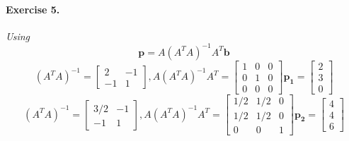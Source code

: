 \documentclass{article}
\begin{document}
\paragraph{Exercise 5.}
    \textit{
        Using
        \[
        \mathbf{p}=A(A^TA)^{-1}A^T\mathbf{b}
        \]
        \[
        (A^TA)^{-1}=\begin{bmatrix}
           2 & -1\\-1 & 1
        \end{bmatrix},
        A(A^TA)^{-1}A^T= \begin{bmatrix}
            1 & 0 & 0\\
            0 & 1 & 0 \\
            0 & 0 & 0
         \end{bmatrix}
        \mathbf{p_1}=\begin{bmatrix}
            2\\3\\0
        \end{bmatrix}
        \]
        \[
            (A^TA)^{-1}=\begin{bmatrix}
                3/2 & -1\\ -1 & 1
             \end{bmatrix},
             A(A^TA)^{-1}A^T= \begin{bmatrix}
                1/2 & 1/2 & 0\\
                1/2 & 1/2 & 0 \\
                0 & 0 & 1
             \end{bmatrix}
             \mathbf{p_2}=\begin{bmatrix}
                 4\\4\\6
             \end{bmatrix}
        \]
    }
\end{document}
